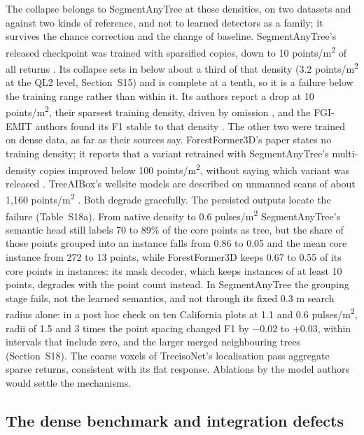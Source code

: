\documentclass[preprint,12pt,authoryear,a4paper]{elsarticle}
\begin{document}
The collapse belongs to SegmentAnyTree at these densities, on two datasets and
against two kinds of reference, and not to learned detectors as a family; it
survives the chance correction and the change of baseline. SegmentAnyTree's
released checkpoint was trained with sparsified copies, down to 10 points/m\textsuperscript{2} of
all returns \citep{wielgosz2024segmentanytree,ruoppa2026benchmarking}. Its collapse
sets in below about a third of that density (3.2 points/m\textsuperscript{2} at the QL2 level,
Section~S15) and is complete at a tenth, so it is a failure below the training
range rather than within it. Its authors report a drop at 10 points/m\textsuperscript{2}, their
sparsest training density, driven by omission \citep{wielgosz2024segmentanytree}, and
the FGI-EMIT authors found its F1 stable to that density
\citep{ruoppa2026benchmarking}. The other two were trained on dense data, as far as
their sources say. ForestFormer3D's paper states no training density; it reports
that a variant retrained with SegmentAnyTree's multi-density copies improved
below 100 points/m\textsuperscript{2}, without saying which variant was released
\citep{xiang2025forestformer3d}. TreeAIBox's wellsite models are described on
unmanned scans of about 1,160 points/m\textsuperscript{2} \citep{movchan2025uavbased}. Both degrade
gracefully. The persisted outputs locate the failure (Table~S18a). From native
density to 0.6 pulses/m\textsuperscript{2} SegmentAnyTree's semantic head still labels 70 to 89\%
of the core points as tree, but the share of those points grouped into an
instance falls from 0.86 to 0.05 and the mean core instance from 272 to 13
points, while ForestFormer3D keeps 0.67 to 0.55 of its core points in instances:
its mask decoder, which keeps instances of at least 10 points, degrades with the
point count instead. In SegmentAnyTree the grouping stage fails, not the learned
semantics, and not through its fixed 0.3 m search radius alone: in a post hoc
check on ten California plots at 1.1 and 0.6 pulses/m\textsuperscript{2}, radii of 1.5 and 3 times
the point spacing changed F1 by $-$0.02 to +0.03, within intervals that include
zero, and the larger merged neighbouring trees (Section~S18). The coarse voxels
of TreeisoNet's localisation pass aggregate sparse returns, consistent with its
flat response. Ablations by the model authors would settle the mechanisms.

\subsection{The dense benchmark and integration defects}\label{sec:6.3}
\end{document}
